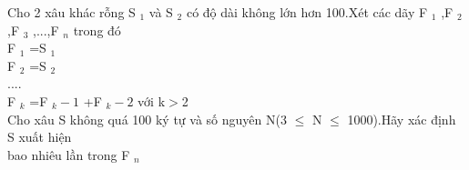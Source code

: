 Cho 2 xâu khác rỗng S   $_    1   $   và S   $_    2   $   có độ dài không lớn hơn 100.Xét các dãy F   $_    1   $   ,F   $_    2   $   ,F   $_    3   $   ,...,F   $_    n   $   trong đó   
\\   F   $_    1   $   =S   $_    1   $
\\   F   $_    2   $   =S   $_    2   $
\\   ....   
\\   F   $_    k   $   =F   $_    k-1   $   +F   $_    k-2   $   với k$>$2   
\\   Cho xâu S không quá 100 ký tự và số nguyên N(3 $\le$ N $\le$ 1000).Hãy xác định S xuất hiện   
\\   bao nhiêu lần trong F   $_    n   $
\\
\\
\\

\